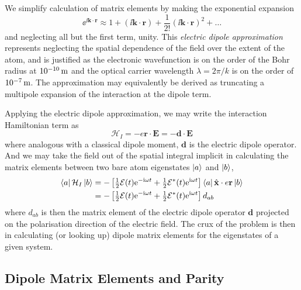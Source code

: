    We simplify calculation of matrix elements by making the exponential
   expansion
    \begin{equation}
      \ee^{\ii\mathbf{k}\cdot\mathbf{r}} \approx 1 + 
      (\ii \mathbf{k}\cdot\mathbf{r}) + 
      \frac{1}{2!} ( \ii \mathbf{k}\cdot\mathbf{r})^2 + \dots 
    \end{equation}
    and neglecting all but the first term, unity. This \textit{electric dipole
    approximation}\cite{grynberg2010introduction} represents neglecting the
    spatial dependence of the field over the extent of the atom, and is
    justified as the electronic wavefunction is on the order of the Bohr radius
    at $\unit[10^{-10}]{m}$ and the optical carrier wavelength $\lambda =
    2\pi/k$ is on the order of $\unit[10^{-7}]{m}$. The approximation may
    equivalently be derived as truncating a multipole expansion of the
    interaction at the dipole term.\cite{cohen1992atom}

    Applying the electric dipole approximation, we may write the interaction Hamiltonian term as 
    \begin{equation}
      \mathcal{H}_I = -e \mathbf{r} \cdot \mathbf{E} 
                    = -\mathbf{d} \cdot \mathbf{E}
    \end{equation}
    where analogous with a classical dipole moment, $\mathbf{d}$ is the
    electric dipole operator. And we may take the field out of the spatial
    integral implicit in calculating the matrix elements between two bare atom
    eigenstates $\Ket{a}$ and $\Ket{b}$,
    \begin{align}
      \Bra{a} \mathcal{H}_I \Ket{b} &= -
        \left [ \tfrac{1}{2} \mathcal{E}(t) 
        \mathrm{e}^{- \mathrm{i} \omega t} +
        \tfrac{1}{2} \mathcal{E}^*(t) \mathrm{e}^{\mathrm{i} \omega t} \right]
        \Bra{a} \hat{\mathbf{x}} \cdot e \mathbf{r}
        \Ket{b} \nonumber \\
        &= - \left [ \tfrac{1}{2} \mathcal{E}(t) 
        \mathrm{e}^{- \mathrm{i} \omega t} +
        \tfrac{1}{2} \mathcal{E}^*(t) \mathrm{e}^{\mathrm{i} \omega t} \right] 
        d_{ab}
    \end{align}
    where $ d_{ab}$ is then the matrix element of the electric dipole operator
    $\mathbf{d}$ projected on the polarisation direction of the electric field.
    The crux of the problem is then in calculating (or looking up) dipole matrix
    elements for the eigenstates of a given system.

  \subsection{Dipole Matrix Elements and Parity}

